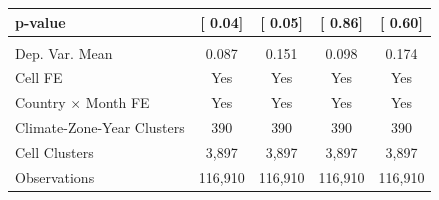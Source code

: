{\begin{tabular}{l*{4}{c}}
\hspace{15pt} p-value&[     0.04]         &[     0.05]         &[     0.86]         &[     0.60]         \\
\hline \\ Dep. Var. Mean& 0.087         & 0.151         & 0.098         & 0.174         \\
Cell FE             &   Yes         &   Yes         &   Yes         &   Yes         \\
Country $\times$ Month FE&   Yes         &   Yes         &   Yes         &   Yes         \\
Climate-Zone-Year Clusters&   390         &   390         &   390         &   390         \\
Cell Clusters       & 3,897         & 3,897         & 3,897         & 3,897         \\
Observations        &116,910         &116,910         &116,910         &116,910         \\
\bottomrule
\end{tabular}
}
